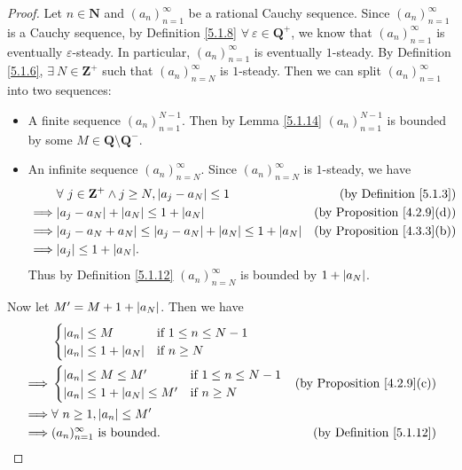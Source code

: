 \begin{proof}
    Let \(n \in \mathbf{N}\) and \((a_n)_{n = 1}^{\infty}\) be a rational Cauchy sequence.
    Since \((a_n)_{n = 1}^{\infty}\) is a Cauchy sequence, by Definition \ref{5.1.8} \(\forall\ \varepsilon \in \mathbf{Q}^+\), we know that \((a_n)_{n = 1}^{\infty}\) is eventually \(\varepsilon\)-steady.
    In particular, \((a_n)_{n = 1}^{\infty}\) is eventually \(1\)-steady.
    By Definition \ref{5.1.6}, \(\exists\ N \in \mathbf{Z}^+\) such that \((a_n)_{n = N}^{\infty}\) is \(1\)-steady.
    Then we can split \((a_n)_{n = 1}^{\infty}\) into two sequences:
    \begin{itemize}
        \item A finite sequence \((a_n)_{n = 1}^{N - 1}\).
              Then by Lemma \ref{5.1.14} \((a_n)_{n = 1}^{N - 1}\) is bounded by some \(M \in \mathbf{Q} \setminus \mathbf{Q}^-\).
        \item An infinite sequence \((a_n)_{n = N}^{\infty}\).
              Since \((a_n)_{n = N}^\infty\) is \(1\)-steady, we have
              \begin{align*}
                           & \forall\ j \in \mathbf{Z}^+ \land j \geq N, \abs*{a_j - a_N} \leq 1           & \text{(by Definition \ref{5.1.3})}     \\
                  \implies & \abs*{a_j - a_N} + \abs*{a_N} \leq 1 + \abs*{a_N}                             & \text{(by Proposition \ref{4.2.9}(d))} \\
                  \implies & \abs*{a_j - a_N + a_N} \leq \abs*{a_j - a_N} + \abs*{a_N} \leq 1 + \abs*{a_N} & \text{(by Proposition \ref{4.3.3}(b))} \\
                  \implies & \abs*{a_j} \leq 1 + \abs*{a_N}.
              \end{align*}
              Thus by Definition \ref{5.1.12} \((a_n)_{n = N}^\infty\) is bounded by \(1 + \abs*{a_N}\).
    \end{itemize}
    Now let \(M' = M + 1 + \abs*{a_N}\).
    Then we have
    \begin{align*}
                 & \begin{cases}
            \abs*{a_n} \leq M              & \text{if } 1 \leq n \leq N - 1 \\
            \abs*{a_n} \leq 1 + \abs*{a_N} & \text{if } n \geq N
        \end{cases}                                                        \\
        \implies & \begin{cases}
            \abs*{a_n} \leq M \leq M'              & \text{if } 1 \leq n \leq N - 1 \\
            \abs*{a_n} \leq 1 + \abs*{a_N} \leq M' & \text{if } n \geq N
        \end{cases}               & \text{(by Proposition \ref{4.2.9}(c))} \\
        \implies & \forall\ n \geq 1, \abs*{a_n} \leq M'                                             \\
        \implies & (a_n)_{n = 1}^\infty \text{ is bounded}. & \text{(by Definition \ref{5.1.12})}
    \end{align*}
\end{proof}

